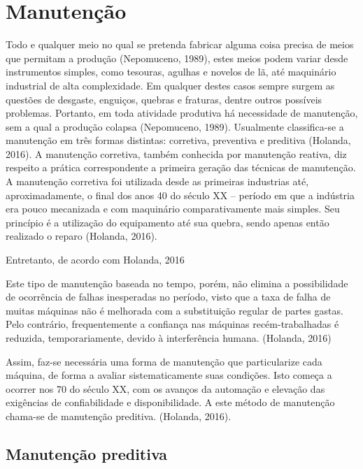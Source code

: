\documentclass[
	12pt,				
	oneside,			
	a4paper,			
	english,			
	brazil				
	]{abntex2ppgsi}
\begin{document}
\section{\textbf{Manutenção}}
Todo e qualquer meio no qual se pretenda fabricar alguma coisa precisa de meios que permitam a produção (Nepomuceno, 1989), estes meios podem variar desde instrumentos simples, como tesouras, agulhas e novelos de lã, até maquinário industrial de alta complexidade. 
Em qualquer destes casos sempre surgem as questões de desgaste, enguiços, quebras e fraturas, dentre outros possíveis problemas. Portanto, em toda atividade produtiva  há necessidade de manutenção, sem a qual a produção colapsa (Nepomuceno, 1989).
Usualmente classifica-se a manutenção em três formas distintas: corretiva, preventiva e preditiva (Holanda, 2016). 
	A manutenção corretiva, também conhecida por manutenção reativa, diz respeito a prática correspondente a primeira geração das técnicas de manutenção. A manutenção corretiva foi utilizada desde as primeiras industrias até, aproximadamente, o final dos anos 40 do século XX – período em que a indústria era pouco mecanizada e com maquinário comparativamente mais simples. Seu princípio é a utilização do equipamento até sua quebra, sendo apenas então realizado o reparo (Holanda, 2016). 
	
Entretanto, de acordo com Holanda, 2016	

\begin{citacao}

	Este tipo de manutenção baseada no tempo, porém, não elimina a possibilidade de ocorrência de falhas inesperadas no período, visto que a taxa de falha de 		muitas máquinas não é melhorada com a substituição regular de partes gastas. Pelo contrário, frequentemente a confiança nas máquinas recém-trabalhadas é 		reduzida, temporariamente, devido à interferência humana. (Holanda, 2016)

\end{citacao}

Assim, faz-se necessária uma forma de manutenção que particularize cada máquina, de forma a avaliar sistematicamente suas condições. Isto começa a ocorrer nos 70 do século XX, com os avanços da automação e elevação das exigências de confiabilidade e disponibilidade. A este método de manutenção chama-se de manutenção preditiva. (Holanda, 2016).  


\subsection{\textbf{Manutenção preditiva}}
\end{document}
